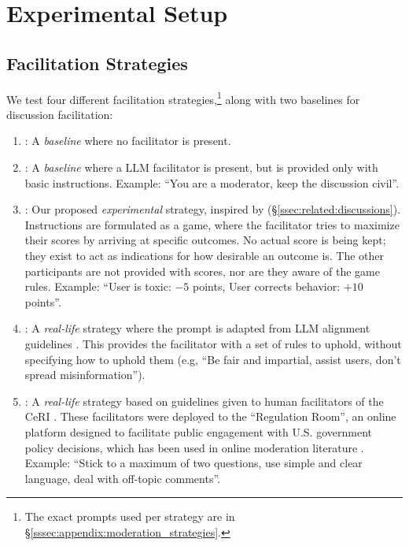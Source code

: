 \section{Experimental Setup}
\label{sec:experimental}

\subsection{Facilitation Strategies}
\label{ssec:experimental:strategies}

We test four different facilitation strategies,\footnote{The exact prompts used per strategy are in \S\ref{sssec:appendix:moderation_strategies}.} along with two baselines for discussion facilitation:

\begin{enumerate}
    \item \textbf{\strategynomod}: A \emph{baseline} where no facilitator is present.

    \item \textbf{\strategynoinstr}: A \emph{baseline} where a \ac{LLM} facilitator is present, but is provided only with basic instructions. Example: “You are a moderator, keep the discussion civil”.

     \item \textbf{\strategymodgame}: Our proposed \emph{experimental} strategy, inspired by  \citet{abdelnabi_negotiations} (\S\ref{ssec:related:discussions}). Instructions are formulated as a game, where the facilitator tries to maximize their scores by arriving at specific outcomes. No actual score is being kept; they exist to act as indications for how desirable an outcome is. The other participants are not provided with scores, nor are they aware of the game rules. Example: ``User is toxic: $-5$ points, User corrects behavior: $+10$ points''.

    \item \textbf{\strategyrules}: A \emph{real-life} strategy where the prompt is adapted from \ac{LLM} alignment guidelines \cite{collective_constitution}. This provides the facilitator with a set of rules to uphold, without specifying how to uphold them (e.g, “Be fair and impartial, assist users, don't spread misinformation”).

    \item \textbf{\strategyregroom}: A \emph{real-life} strategy based on guidelines given to human facilitators of the \ac{CeRI} \citep{Cornell_eRulemaking2017}. These facilitators were deployed to the “Regulation Room”, an online platform designed to facilitate public engagement with U.S. government policy decisions, which has been used in online moderation literature \cite{seering_self_moderation, park_et_al_2012_facilitation}. Example: ``Stick to a maximum of two questions, use simple and clear language, deal with off-topic comments''.


\end{enumerate}
